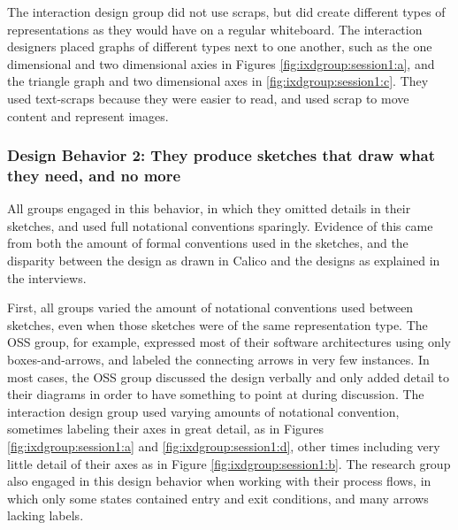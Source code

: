 The interaction design group did not use scraps, but did create different types of representations as they would have on a regular whiteboard. The interaction designers placed graphs of different types next to one another, such as the one dimensional and two dimensional axies in Figures \ref{fig:ixdgroup:session1:a}, and the triangle graph and two dimensional axes in \ref{fig:ixdgroup:session1:c}. They used text-scraps because they were easier to read, and used scrap to move content and represent images. 


\subsubsection{Design Behavior 2: They produce sketches that draw what they need, and no more}

All groups engaged in this behavior, in which they omitted details in their sketches, and used full notational conventions sparingly. Evidence of this came from both the amount of formal conventions used in the sketches, and the disparity between the design as drawn in Calico and the designs as explained in the interviews.

First, all groups varied the amount of notational conventions used between sketches, even when those sketches were of the same representation type. The OSS group, for example, expressed most of their software architectures using only boxes-and-arrows, and labeled the connecting arrows in very few instances. In most cases, the OSS group discussed the design verbally and only added detail to their diagrams in order to have something to point at during discussion. The interaction design group used varying amounts of notational convention, sometimes labeling their axes in great detail, as in Figures \ref{fig:ixdgroup:session1:a} and \ref{fig:ixdgroup:session1:d}, other times including very little detail of their axes as in Figure \ref{fig:ixdgroup:session1:b}. The research group also engaged in this design behavior when working with their process flows, in which only some states contained entry and exit conditions, and many arrows lacking labels. 

